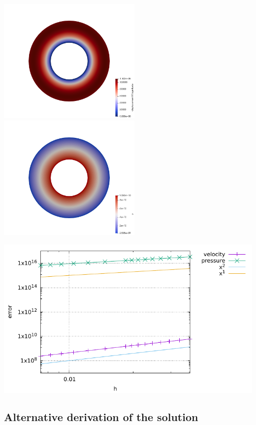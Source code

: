 \begin{center}
\includegraphics[width=7cm]{python_codes/fieldstone_36/disp}
\includegraphics[width=7cm]{python_codes/fieldstone_36/p}
\end{center}

\begin{center}
\includegraphics[width=14cm]{python_codes/fieldstone_36/errors}
\end{center}

\subsection{Alternative derivation of the solution}

